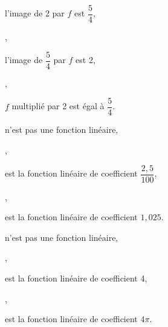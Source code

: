 \ifdefined\COMPLETE
\else
    
    
\fi

\thispagestyle{empty}
\vspace*{-2mm}

\ifdefined\CORRECTION
    \begin{alterqcm}[lq=10cm,correction]
\else
    \begin{alterqcm}[lq=10cm]
\fi


 

  {%
   {\begin{minipage}[t]{6cm} l'image de 2 par $f$ est $\dfrac{5}{4}$, \end{minipage}},
   {\begin{minipage}[t]{6cm} l'image de $\dfrac{5}{4}$ par $f$ est 2,\end{minipage}},
   {\begin{minipage}[t]{6cm} $f$ multiplié par 2 est égal à $\dfrac{5}{4}$.
    \end{minipage}}
 }

  {%
   {\begin{minipage}[t]{7cm} n'est pas une fonction linéaire, \end{minipage}},
   {\begin{minipage}[t]{7cm} est la fonction linéaire de coefficient $\dfrac{2,5}{100}$,\end{minipage}},
   {\begin{minipage}[t]{7cm} est la fonction linéaire de coefficient $1,025$.
    \end{minipage}}
 }

  {%
   {\begin{minipage}[t]{7cm} n'est pas une fonction linéaire, \end{minipage}},
   {\begin{minipage}[t]{7cm} est la fonction linéaire de coefficient 4,\end{minipage}},
   {\begin{minipage}[t]{7cm} est la fonction linéaire de coefficient $4\pi$.
    \end{minipage}}
 }


\end{alterqcm}
\end{alterqcm}
